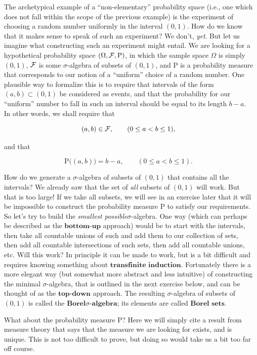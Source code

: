 \begin{example}
The archetypical example of a ``non-elementary''
probability space (i.e., one which does not fall
within the scope of the previous example) is the
experiment of choosing a random number uniformly in
the interval $(0,1)$. How do we know that it makes
sense to speak of such an experiment? We don't, \emph{yet}.
But let us imagine what constructing such an
experiment might entail. We are looking for a
hypothetical probability space
$(\Omega, {\cal F}, \mathrm{P})$, in which the sample
space $\Omega$ is simply $(0,1)$, ${\cal F}$ is some
$\sigma$-algebra of subsets of $(0,1)$, and
$\mathrm{P}$ is a probability measure that
corresponds to our notion of a ``uniform'' choice of a
random number. One plausible way to formalize this is
to require that intervals of the form
$(a,b) \subset (0,1)$ be considered as events, and
that the probability for our ``uniform'' number to
fall in such an interval should be equal to its length
$b-a$. In other words, we shall require that

\[
(a,b) \in {\cal F}, \qquad (0\le a<b\le 1),
\]

\noindent and that

\begin{equation*} \tag{1}\label{eq:lebesgue}
\mathrm{P}\big((a,b)\big) = b-a, \qquad (0\le a<b\le 1).
\end{equation*}

\noindent How do we generate a $\sigma$-algebra of subsets of
$(0,1)$ that contains all the intervals? We already
saw that the set of \emph{all} subsets of $(0,1)$ will
work. But that is too large! If we take all subsets,
we will see in an exercise later that it will be
impossible to construct the probability measure
$\mathrm{P}$ to satisfy our requirements. So let's
try to build the \emph{smallest possible}$\sigma$-algebra.
One way (which can perhaps be described as the
$\textbf{bottom-up}$ approach) would be to start with
the intervals, then take all countable unions of such
and add them to our collection of sets, then add all
countable intersections of such sets, then add all
countable unions, etc. Will this work? In principle it
can be made to work, but is a bit difficult and
requires knowing something about
$\textbf{transfinite induction}$. Fortunately there
is a more elegant way (but somewhat more abstract and
less intuitive) of constructing the minimal
$\sigma$-algebra, that is outlined in the next
exercise below, and can be thought of as the
$\textbf{top-down}$ approach. The resulting
$\sigma$-algebra of subsets of $(0,1)$ is called the
$\textbf{Borel$\sigma$-algebra}$; its elements are
called $\textbf{Borel sets}$.

What about the probability measure $\mathrm{P}$? Here
we will simply cite a result from measure theory that
says that the measure we are looking for exists, and
is unique. This is not too difficult to prove, but
doing so would take us a bit too far off course.
\end{example}

